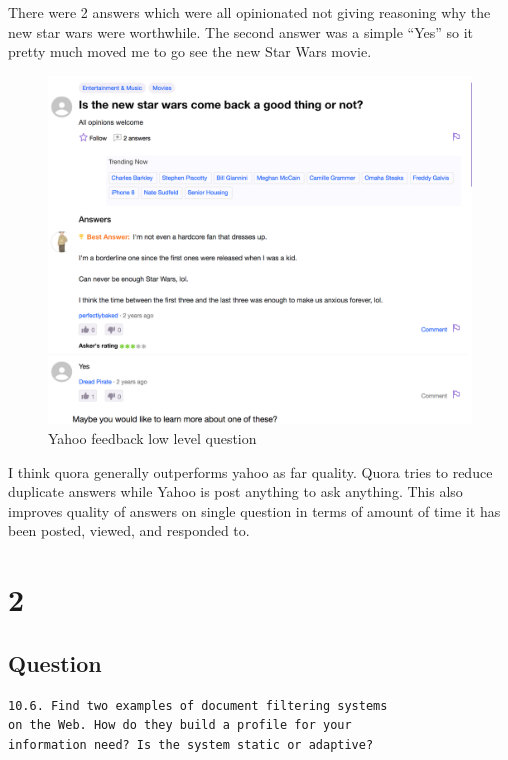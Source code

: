 \documentclass[letterpaper,11pt]{article}
\begin{document}
There were 2 answers which were all opinionated not giving reasoning why the new star wars were worthwhile.
The second answer was a simple ``Yes'' so it pretty much moved me to go see the new Star Wars movie.

\begin{figure}[h]
\centering
\includegraphics[scale=0.4]{yahoo.png}
\caption{Yahoo feedback low level question}
\label{fig:qf2}
\end{figure}

I think quora generally outperforms yahoo as far quality.
Quora tries to reduce duplicate answers while Yahoo is post anything to ask anything.
This also improves quality of answers on single question in terms of amount of time it has been posted, viewed, and responded to.


\clearpage

\section*{2}

\subsection*{Question}

\begin{verbatim}
10.6. Find two examples of document filtering systems 
on the Web. How do they build a profile for your
information need? Is the system static or adaptive?
\end{verbatim}
\end{document}

